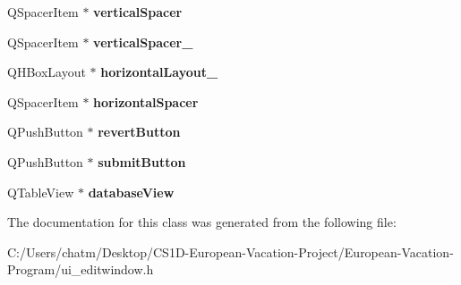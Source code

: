\begin{DoxyCompactItemize}
Q\+Spacer\+Item $\ast$ {\bfseries vertical\+Spacer}
\item 
\mbox{\label{class_ui___edit_window_a28b00d8e069426faf59f57f20f59d7dc}} 
Q\+Spacer\+Item $\ast$ {\bfseries vertical\+Spacer\+\_}
\item 
\mbox{\label{class_ui___edit_window_a29aa32fb453b4e80cc607daddcec85ca}} 
Q\+H\+Box\+Layout $\ast$ {\bfseries horizontal\+Layout\+\_}
\item 
\mbox{\label{class_ui___edit_window_ac7d8399503fb39a87a6ab8a90ebd7a8b}} 
Q\+Spacer\+Item $\ast$ {\bfseries horizontal\+Spacer}
\item 
\mbox{\label{class_ui___edit_window_ac050e1e897d7586d3fd1504d4c45e583}} 
Q\+Push\+Button $\ast$ {\bfseries revert\+Button}
\item 
\mbox{\label{class_ui___edit_window_acb1a4bc3d3ca7ac89aadec3fd0d8136e}} 
Q\+Push\+Button $\ast$ {\bfseries submit\+Button}
\item 
\mbox{\label{class_ui___edit_window_abc08309be18778796f46843dbcdd58aa}} 
Q\+Table\+View $\ast$ {\bfseries database\+View}
\end{DoxyCompactItemize}


The documentation for this class was generated from the following file\+:\begin{DoxyCompactItemize}
\item 
C\+:/\+Users/chatm/\+Desktop/\+C\+S1\+D-\/\+European-\/\+Vacation-\/\+Project/\+European-\/\+Vacation-\/\+Program/ui\+\_\+editwindow.\+h\end{DoxyCompactItemize}
